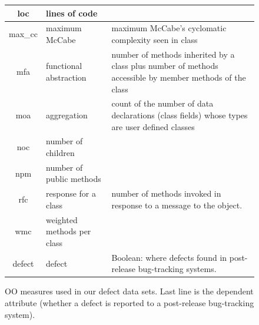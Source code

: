 \documentclass[10pt, journal, compsoc]{IEEEtran}
\begin{document}
\begin{figure}[htbp!]
\begin{center}
{\begin{tabular}{c|l|p{4.7in}}
        loc & lines of code &\\\hline
        max\_cc & maximum McCabe & maximum McCabe's cyclomatic complexity seen
        in class\\\hline
        mfa & functional abstraction & number of methods inherited by a class
        plus number of methods accessible by member methods of the
        class\\\hline
        moa &  aggregation &  count of the number of data declarations (class
        fields) whose types are user defined classes\\\hline
        noc &  number of children &\\\hline
        npm & number of public methods & \\\hline
        rfc & response for a class &number of  methods invoked in response to
        a message to the object.\\\hline
        wmc & weighted methods per class &\\\hline
        \rowcolor{lightgray}
        defect & defect & Boolean: where defects found in post-release bug-tracking systems.
      \end{tabular}
    }
  \end{center}
  \caption{OO measures used in our defect data sets.  Last line is
    the dependent attribute (whether a defect is reported to  a
    post-release bug-tracking system).}\label{fig:ck}
\end{figure}
\end{document}
